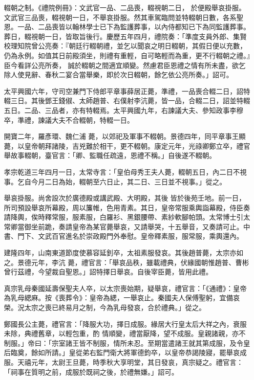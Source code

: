 \begin{pinyinscope}
 輟朝之制。《禮院例冊》：文武官一品、二品喪，輟視朝二日，
 於便殿舉哀掛服。文武官三品喪，輟視朝一日，不舉哀掛服。然其車駕臨問並特輟朝日數，各系聖恩。一品、二品喪皆以翰林學士已下為監護葬事，以內侍都知已下為同監護葬事。葬日，輟視朝一日，皆取旨後行。慶歷五年四月，禮院奏：「準度支員外郎、集賢校理知院曾公亮奏：『朝廷行輟朝禮，並乞以聞哀之明日輟朝，其假日便以充數，仍為永例。如值其日前殿須坐，則禮有重輕，自可略輕而為重，更不行輟朝之禮。』臣今看詳公亮所奏，
 誠於輟朝之間適宜順變。然慮君臣恩禮之情有所未盡，欲乞除人使見辭、春秋二宴合當舉樂，即於次日輟朝，餘乞依公亮所奏。」詔可。



 太平興國六年，守司空兼門下侍郎平章事薛居正薨，準禮，一品喪合輟二日，詔特輟三日。其後鄧王錢俶、太師趙普、右僕射李沆薨，皆一品，合輟二日，詔並特輟五日。二品、三品者，亦有特輟焉。太平興國九年，右諫議大夫、參知政事李穆卒，準禮，諫議大夫不合輟朝，特輟一日。



 開寶二年，羅彥環、魏仁浦
 薨，以郊祀及軍事不輟朝。景德四年，同平章事王顯薨，以皇帝朝拜諸陵，吉兇難於相干，更不輟朝。康定元年，光祿卿鄭立卒，禮官舉故事輟朝，臺官言：「卿、監職任疏遠，恩禮不稱。」自後遂不輟朝。



 孝宗乾道三年四月一日，太常寺言：「皇伯母秀王夫人薨，輟朝五日，內二日不視事。乞自今月二日為始，輟朝至六日止，其二日、三日並不視事。」從之。



 舉哀掛服。尚舍設次於廣德殿或講武殿、大明殿，其後
 皆於後苑壬地。前一日，所司預設舉哀所幕殿，周以簾帷，色用青素。其日，皇帝常服乘輿詣幕殿，侍臣奏請降輿，俟時釋常服，服素服，白羅衫、黑銀腰帶、素紗軟腳帕頭。太常博士引太常卿當御坐前跪，奏請皇帝為某官薨舉哀，又請舉哭，十五舉音，又奏請可止。中書、門下、文武百官進名於崇政殿門外奉慰。皇帝釋素服，服常服，乘輿還內。



 建隆四年，山南東道節度使慕容延釗卒，太祖素服發哀。其後趙普薨，太宗亦如之。景德元年，李沆
 薨，禮官言：「舉哀品秩，雖載禮典，伏緣國朝惟趙普、曹彬曾行茲禮，今望裁自聖恩。」詔特擇日舉哀。自後宰臣薨，皆用此禮。



 真宗乳母秦國延壽保聖夫人卒，以太宗喪始期，疑舉哀，禮官言：「《通禮》：皇帝為乳母緦麻。按《喪葬令》：皇帝為緦，一舉哀止。秦國夫人保傅聖躬，宜備哀榮。況太宗之喪已終易月之制，今為乳母發哀，合於禮典。」從之。



 鄭國長公主薨，禮官言：「降服大功，擇日成服。緣居大行皇太后大祥之內，衰服未除，典禮舊章，以輕包重，酌
 情順變，禮當厭降，望不成服。皇親諸親，亦不制服。」帝曰：「宗室諸王皆不制服，情所未忍。至期當遣諸王就其第成服，及令皇后臨奠，餘如所請。」皇從弟右監門衛大將軍德鈞卒，以皇帝恭謁陵寢，罷舉哀成服。天禧元年，太尉王旦薨，時季秋大享明堂，其日發哀，真宗疑之。禮官言：「祠事在質明之前，成服於既祠之後，於禮無嫌。」詔可。




\end{pinyinscope}
